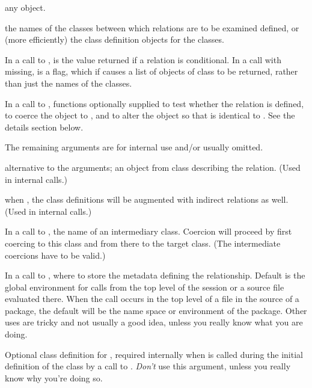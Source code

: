 \begin{Arguments}
\begin{ldescription}
\item[\code{object}] any \R{} object.
\item[\code{class1, class2}] 
the names of the classes between which  relations are to be
examined defined, or (more efficiently) the class definition
objects for the classes.

\item[\code{maybe, fullInfo}] 
In a call to ,  is the value returned if
a relation is conditional. In a call with  missing,
 is a flag, which if  causes a list of
objects of class  to be returned, rather than
just the names of the classes.

\item[\code{test, coerce, replace}] 
In a call to , functions optionally supplied to test
whether the relation is defined, to coerce the object to
, and to alter the object so that 
is identical to .  See the details section below.

The remaining arguments are for internal use and/or usually omitted.

\item[\code{extensionObject}]  alternative to the  arguments; an object from class
 describing the relation.  (Used in internal calls.)

\item[\code{doComplete}] when , the class definitions will be
augmented with indirect relations as well.  (Used in internal calls.)
\item[\code{by}] 
In a call to , the name of an intermediary class.
Coercion will proceed by first coercing to this class and from there
to the target class.  (The intermediate coercions have to be valid.)
\item[\code{where}] 
In a call to , where to store the metadata defining the
relationship.  Default is the global environment for calls from the
top level of the session or a source file evaluated there.  When the
call occurs in the top level of a file in the source of a package,
the default will be the name space or environment of the package.
Other uses are tricky and not usually a good idea, unless you really
know what you are doing.
\item[\code{classDef}] 
Optional class definition for  , required internally
when  is called during the initial definition of the
class by a call to . \emph{Don't} use this
argument, unless you really know why you're doing so.
\end{ldescription}
\end{Arguments}
